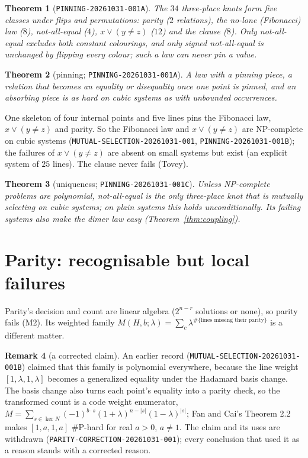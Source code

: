 \documentclass[11pt]{article}
\newtheorem{theorem}{Theorem}
\theoremstyle{definition}
\newtheorem{remark}[theorem]{Remark}
\begin{document}
\begin{theorem}[\texttt{PINNING-20261031-001A}]\label{thm:five}
The $34$ three-place knots form five classes under flips and permutations: parity ($2$ relations), the no-lone (Fibonacci) law ($8$),
not-all-equal ($4$), $x\vee(y\neq z)$ ($12$) and the clause ($8$). Only not-all-equal excludes both constant colourings, and only signed
not-all-equal is unchanged by flipping every colour; such a law can never pin a value.
\end{theorem}

\begin{theorem}[pinning; \texttt{PINNING-20261031-001A}]\label{thm:pinning}
A law with a pinning piece, a relation that becomes an equality or disequality once one point is pinned, and an absorbing piece is as
hard on cubic systems as with unbounded occurrences.
\end{theorem}

One skeleton of four internal points and five lines pins the Fibonacci law, $x\vee(y\neq z)$ and parity. So the Fibonacci law and
$x\vee(y\neq z)$ are NP-complete on cubic systems (\texttt{MUTUAL-SELECTION-20261031-001}, \texttt{PINNING-20261031-001B}); the
failures of $x\vee(y\neq z)$ are absent on small systems but exist (an explicit system of $25$ lines). The clause never fails (Tovey).

\begin{theorem}[uniqueness; \texttt{PINNING-20261031-001C}]\label{thm:unique}
Unless NP-complete problems are polynomial, not-all-equal is the only three-place knot that is mutually selecting on cubic systems; on
plain systems this holds unconditionally. Its failing systems also make the dimer law easy (Theorem~\ref{thm:coupling}).
\end{theorem}

\section{Parity: recognisable but local failures}\label{sec:parity}

Parity's decision and count are linear algebra ($2^{n-r}$ solutions or none), so parity fails (M2). Its weighted family
$M(H,b;\lambda)=\sum_c\lambda^{\#\{\text{lines missing their parity}\}}$ is a different matter.

\begin{remark}[a corrected claim]
An earlier record (\texttt{MUTUAL-SELECTION-20261031-001B}) claimed that this family is polynomial everywhere, because the line weight
$[1,\lambda,1,\lambda]$ becomes a generalized equality under the Hadamard basis change. The basis change also turns each point's
equality into a parity check, so the transformed count is a code weight enumerator,
$M=\sum_{s\in\ker N}(-1)^{b\cdot s}(1+\lambda)^{n-|s|}(1-\lambda)^{|s|}$; Fan and Cai's Theorem 2.2 makes $[1,a,1,a]$ \#P-hard for
real $a>0$, $a\neq1$. The claim and its uses are withdrawn (\texttt{PARITY-CORRECTION-20261031-001}); every conclusion that used it as a
reason stands with a corrected reason.
\end{remark}
\end{document}
